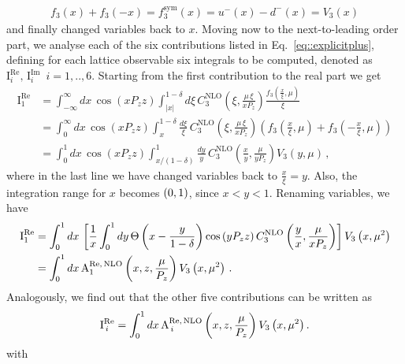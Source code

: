 \begin{align} 
	f_3\left(x\right)+f_3\left(-x\right) = f_3^{\text{sym}}\left(x\right) = u^-\left(x\right) - d^-\left(x\right) = V_3\left(x\right) 
\end{align}
and finally changed variables back to $x$.  
Moving now to the next-to-leading order part, we analyse each of the six contributions listed in
Eq.~\eqref{eq::explicitplus}, defining for each lattice observable six integrals
to be computed, denoted as
$\text{I}^{\text{Re}}_i,\,\text{I}^{\text{Im}}_i\,\,\, i = 1,..,6$. Starting
from the first contribution to the real part we get
\begin{align}
	\text{I}^{\text{Re}}_1 
	  & =\int_{-\infty}^{\infty} dx\, \cos\left(x P_z z\right)
	  \int_{|x|}^{1-\delta}d\xi\, 
	  C_3^{\text{NLO}}\left(\xi,\frac{\mu\,\xi}{xP_z}\right)
	  \frac{f_3\left(\frac{x}{\xi},\mu\right)}{\xi} \nonumber \\
	  & = \int_{0}^{\infty} dx\, \cos\left(x P_z z\right)
	  \int_{x}^{1-\delta}\frac{d\xi}{\xi}\,
	  C_3^{\text{NLO}}\left(\xi,\frac{\mu\,\xi}{xP_z}\right)
	  \left(f_3\left(\frac{x}{\xi},\mu\right) + 
	  f_3\left(-\frac{x}{\xi},\mu\right) \right) \nonumber \\
	  & =\int_{0}^{1} dx\, \cos\left(x P_z z\right)
	  \int_{x/(1-\delta)}^{1}\frac{dy}{y}\,
	  C_3^{\text{NLO}}\left(\frac{x}{y},\frac{\mu}{y P_z}\right) V_3\left(y,\mu\right)\, ,
\end{align}
where in the last line we have changed variables back to $\frac{x}{\xi} = y$.
Also, the integration range for $x$ becomes $\left( 0,1 \right)$, since $x<y<1$.
Renaming variables, we have
\begin{align}
	\text{I}^{\text{Re}}_1 
	  & = \int_{0}^{1}dx\,
	  	\left[
			  \frac{1}{x}\int_{0}^{1} dy\, 
			  \Theta\left( x - \frac{y}{1-\delta} \right)
			  \cos\left(y P_z z\right) 
			  C_3^{\text{NLO}}\left(\frac{y}{x},\frac{\mu}{x P_z}\right)
		\right]
	V_3\left(x,\mu^2\right) \nonumber \\
	  & = \int_{0}^{1}dx\, 
		  \text{A}^{\text{Re},\,\text{NLO}}_1 \left( x, z, \frac{\mu}{P_z} \right) 
		  V_3\left(x,\mu^2\right)\, . 
\end{align}
Analogously, we find out that the other five contributions can be written as 
\begin{align}
	\text{I}^{\text{Re}}_{\,i} =
	\int_{0}^{1}dx\, \text{A}^{\text{Re},\,\text{NLO}}_{\,i} \left( x, z, \frac{\mu}{P_z} \right) V_3\left(x,\mu^2\right). 
\end{align}
with
